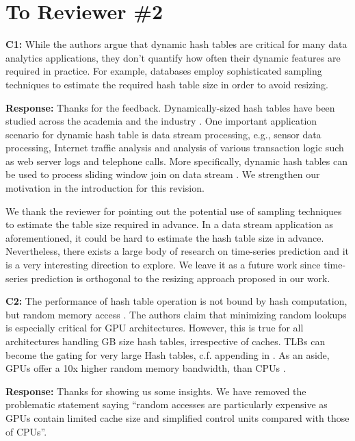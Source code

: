 \section*{To Reviewer \#2}

\begin{shaded}
	\noindent\textbf{C1:} While the authors argue that dynamic hash tables are critical for many data analytics applications, they don't quantify how often their dynamic features are required in practice. For example, databases employ sophisticated sampling techniques to estimate the required hash table size in order to avoid resizing. 
\end{shaded}
%
\noindent\textbf{Response:} 
Thanks for the feedback. Dynamically-sized hash tables have been studied across the academia \cite{liu2014dynamic,ashkiani2018dynamic} and the industry \cite{larson2003scaleable,douceur2000hash}. 
One important application scenario for dynamic hash table is data stream processing, e.g., sensor data processing, Internet traffic analysis and analysis of various transaction logic such as web server logs and telephone calls. 
More specifically, dynamic hash tables can be used to process sliding window join on data stream \cite{golab2003processing}. We strengthen our motivation in the introduction for this revision.

We thank the reviewer for pointing out the potential use of sampling techniques to estimate the table size required in advance. In a data stream application as aforementioned, it could be hard to estimate the hash table size in advance. Nevertheless, there exists a large body of research on time-series prediction and it is a very interesting direction to explore. We leave it as a future work since time-series prediction is orthogonal to the resizing approach proposed in our work. 



\begin{shaded}
	\noindent\textbf{C2:} The performance of hash table operation is not bound by hash computation, but random memory access \cite{GPU-Join-A}. The authors claim that minimizing random lookups is especially critical for GPU architectures. However, this is true for all architectures handling GB size hash tables, irrespective of caches. TLBs can become the gating for very large Hash tables, c.f. appending in \cite{kaldewey2012gpu}. As an aside, GPUs offer a 10x higher random memory bandwidth, than CPUs \cite{GPU-Join-B}.
\end{shaded}
%
\noindent\textbf{Response:} 
Thanks for showing us some insights. 
We have removed the problematic statement saying ``random accesses are particularly expensive as GPUs contain limited cache size and simplified control units compared with those of CPUs''.

